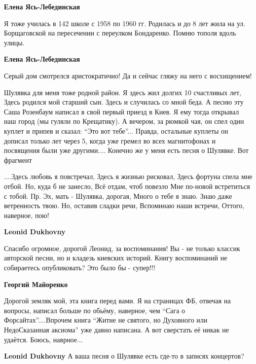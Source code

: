 \begin{itemize}
\begin{itemize}
\textbf{Елена Ясь-Лебединская} 

Я тоже училась в 142 школе с 1958 по 1960 гг. Родилась и до 8 лет жила на ул.
Борщаговской на пересечении с переулком Бондаренко. Помню тополя вдоль улицы.

\textbf{Елена Ясь-Лебединская} 

Серый дом смотрелся аристократично! Да и сейчас гляжу на него с восхищением!
\end{itemize} %


Шулявка для меня тоже родной район. Я здесь жил долгих 10 счастливых лет, Здесь
родился мой старший сын. Здесь и случилась со мной беда. А песню эту Саша
Розенбаум написал в свой первый приезд в Киев. Я ему тогда открывал наш город
(мы гуляли по Крещатику). А вечером, за рюмкой чая, он спел один куплет и
припев и сказал: \enquote{Это вот тебе}... Правда, остальные куплеты он дописал
только лет через 5, когда уже гремел во всех магнитофонах и посвящения были уже
другими.... Конечно же у меня есть песня о Шулявке. Вот фрагмент

\obeycr
....Здесь любовь я повстречал,
Здесь я жизнью рисковал,
Здесь фортуна спела мне отбой.
Но, куда б не занесло,
Всё отдам, чтоб повезло
Мне по-новой встретиться с тобой.
Пр. Эх, мать - Шулявка, дорогая,
Много о тебе я знаю.
Знаю даже ветренность твою.
Но, оставив сладки речи,
Вспоминаю наши встречи,
Оттого, наверное, пою!
\restorecr

\begin{itemize} %
\textbf{Leonid Dukhovny} 

Спасибо огромное, дорогой Леонид, за воспоминания! Вы - не только классик
авторской песни, но и кладезь киевских историй. Книгу воспоминаний не
собираетесь опубликовать? Это было бы - супер!!!

\begin{itemize} %
\textbf{Георгий Майоренко} 

Дорогой земляк мой, эта книга перед вами. Я на страницах ФБ, отвечая на
вопросы, написал больше по обьёму, наверное, чем \enquote{Сага о Форсайтах}....Впрочем
книга \enquote{Житие не святого, но Духовного или НедоСказанная аксиома} уже давно
написана. А вот сверстать её никак не удаётся. Боюсь, наврное...

\end{itemize} %

\textbf{Leonid Dukhovny} А ваша песня о Шулявке есть где-то в записях концертов?


\end{itemize}
\end{itemize}
